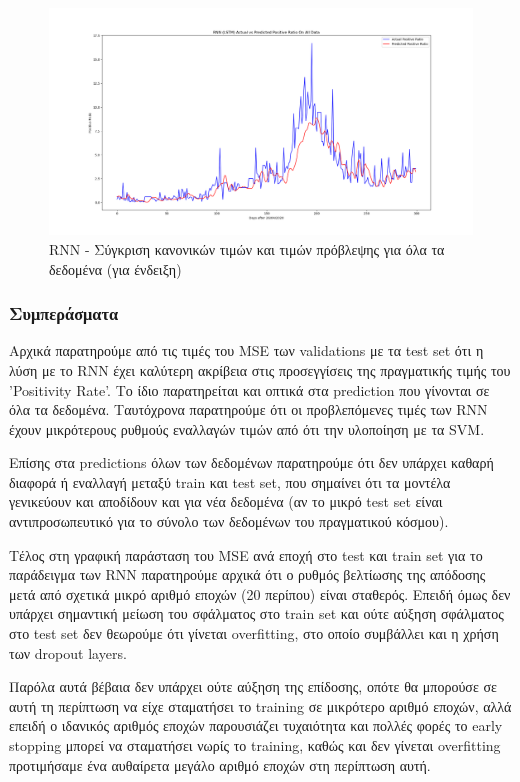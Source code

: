 \documentclass[12pt,a4paper]{article}
\begin{document}
\begin{figure}[H]
	\includegraphics[width=\textwidth]{Figures/Question3/7. SVR Actual vs Predicted All Data.png}
	\caption{RNN - Σύγκριση κανονικών τιμών και τιμών πρόβλεψης για όλα τα δεδομένα (για ένδειξη)}
\end{figure}

\subsubsection{Συμπεράσματα}

Αρχικά παρατηρούμε από τις τιμές του MSE των validations με τα test set ότι η λύση με το RNN έχει καλύτερη ακρίβεια στις προσεγγίσεις της πραγματικής τιμής του 'Positivity Rate'. Το ίδιο παρατηρείται και οπτικά στα prediction που γίνονται σε όλα τα δεδομένα. Ταυτόχρονα παρατηρούμε ότι οι προβλεπόμενες τιμές των RNN έχουν μικρότερους ρυθμούς εναλλαγών τιμών από ότι την υλοποίηση με τα SVM.

Επίσης στα predictions όλων των δεδομένων παρατηρούμε ότι δεν υπάρχει καθαρή διαφορά ή εναλλαγή μεταξύ train και test set, που σημαίνει ότι τα μοντέλα γενικεύουν και αποδίδουν και για νέα δεδομένα (αν το μικρό test set είναι αντιπροσωπευτικό για το σύνολο των δεδομένων του πραγματικού κόσμου).

Τέλος στη γραφική παράσταση του MSE ανά εποχή στο test και train set για το παράδειγμα των RNN παρατηρούμε αρχικά ότι ο ρυθμός βελτίωσης της απόδοσης μετά από σχετικά μικρό αριθμό εποχών (20 περίπου) είναι σταθερός. Επειδή όμως δεν υπάρχει σημαντική μείωση του σφάλματος στο train set και ούτε αύξηση σφάλματος στο test set δεν θεωρούμε ότι γίνεται overfitting, στο οποίο συμβάλλει και η χρήση των dropout layers. 

Παρόλα αυτά βέβαια δεν υπάρχει ούτε αύξηση της επίδοσης, οπότε θα μπορούσε σε αυτή τη περίπτωση να είχε σταματήσει το training σε μικρότερο αριθμό εποχών, αλλά επειδή ο ιδανικός αριθμός εποχών παρουσιάζει τυχαιότητα και πολλές φορές το early stopping μπορεί να σταματήσει νωρίς το training, καθώς και δεν γίνεται overfitting προτιμήσαμε ένα αυθαίρετα μεγάλο αριθμό εποχών στη περίπτωση αυτή.
\end{document}
